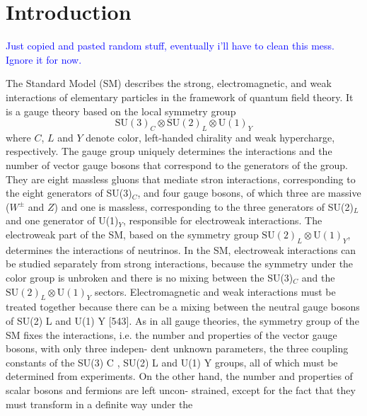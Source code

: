 
\chapter{Introduction}
\label{cha:1}

\textcolor{blue}{Just copied and pasted random stuff, eventually i'll have to clean this mess.
Ignore it for now.}



The Standard Model (SM) describes the strong, electromagnetic, and weak interactions %
of elementary particles in the framework of quantum field theory.
It is a gauge theory based on the local symmetry group 
\begin{equation}
  \label{eq:smgroup}
  \mathrm{SU(3)}_C \otimes \mathrm{SU(2)}_L \otimes \mathrm{U(1)}_Y
\end{equation}
where $C$, $L$ and $Y$ denote color, left-handed chirality and weak hypercharge, respectively.
The gauge group uniquely determines the interactions and the number of %
vector gauge bosons that correspond to the generators of the group.
They are eight massless gluons that mediate stron interactions, %
corresponding to the eight generators of SU(3)$_C$, and four gauge bosons, %
of which three are massive ($W^\pm$ and $Z$) and one is massless, corresponding %
to the three generators of SU(2)$_L$ and one generator of U(1)$_Y$, responsible for %
electroweak interactions.
The electroweak part of the SM, based on the symmetry group %
$\mathrm{SU(2)}_L \otimes \mathrm{U(1)}_Y$, determines the interactions of neutrinos.
In the SM, electroweak interactions can be studied separately from strong interactions, %
because the symmetry under the color group is unbroken and there is no mixing %
between the SU(3)$_C$ and the $\mathrm{SU(2)}_L \otimes \mathrm{U(1)}_Y$ sectors.
Electromagnetic and weak interactions must be treated together because there can %
be a mixing between the neutral gauge bosons of SU(2) L and U(1) Y [543].
As in all gauge theories, the symmetry group of the SM fixes the interactions, %
i.e. the number and properties of the vector gauge bosons, with only three indepen- %
dent unknown parameters, the three coupling constants of the SU(3) C , SU(2) L and %
U(1) Y groups, all of which must be determined from experiments. On the other %
hand, the number and properties of scalar bosons and fermions are left uncon- %
strained, except for the fact that they must transform in a definite way under the %
